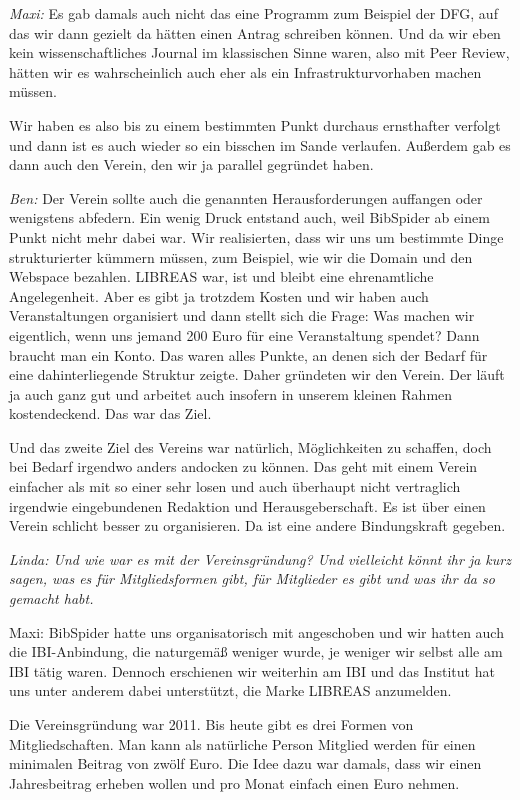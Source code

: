 \documentclass[a4paper,
fontsize=11pt,
oneside,
numbers=noperiodatend,
parskip=half-,
bibliography=totoc,
final
]{scrartcl}
\begin{document}
\emph{Maxi:} Es gab damals auch nicht das eine Programm zum Beispiel der
DFG, auf das wir dann gezielt da hätten einen Antrag schreiben können.
Und da wir eben kein wissenschaftliches Journal im klassischen Sinne
waren, also mit Peer Review, hätten wir es wahrscheinlich auch eher als
ein Infrastrukturvorhaben machen müssen.

Wir haben es also bis zu einem bestimmten Punkt durchaus ernsthafter
verfolgt und dann ist es auch wieder so ein bisschen im Sande verlaufen.
Außerdem gab es dann auch den Verein, den wir ja parallel gegründet
haben.

\emph{Ben:} Der Verein sollte auch die genannten Herausforderungen
auffangen oder wenigstens abfedern. Ein wenig Druck entstand auch, weil
BibSpider ab einem Punkt nicht mehr dabei war. Wir realisierten, dass
wir uns um bestimmte Dinge strukturierter kümmern müssen, zum Beispiel,
wie wir die Domain und den Webspace bezahlen. LIBREAS war, ist und
bleibt eine ehrenamtliche Angelegenheit. Aber es gibt ja trotzdem Kosten
und wir haben auch Veranstaltungen organisiert und dann stellt sich die
Frage: Was machen wir eigentlich, wenn uns jemand 200 Euro für eine
Veranstaltung spendet? Dann braucht man ein Konto. Das waren alles
Punkte, an denen sich der Bedarf für eine dahinterliegende Struktur
zeigte. Daher gründeten wir den Verein. Der läuft ja auch ganz gut und
arbeitet auch insofern in unserem kleinen Rahmen kostendeckend. Das war
das Ziel.

Und das zweite Ziel des Vereins war natürlich, Möglichkeiten zu
schaffen, doch bei Bedarf irgendwo anders andocken zu können. Das geht
mit einem Verein einfacher als mit so einer sehr losen und auch
überhaupt nicht vertraglich irgendwie eingebundenen Redaktion und
Herausgeberschaft. Es ist über einen Verein schlicht besser zu
organisieren. Da ist eine andere Bindungskraft gegeben.

\emph{Linda: Und wie war es mit der Vereinsgründung? Und vielleicht
könnt ihr ja kurz sagen, was es für Mitgliedsformen gibt, für Mitglieder
es gibt und was ihr da so gemacht habt.}

Maxi: BibSpider hatte uns organisatorisch mit angeschoben und wir hatten
auch die IBI-An\-bindung, die naturgemäß weniger wurde, je weniger wir
selbst alle am IBI tätig waren. Dennoch erschienen wir weiterhin am IBI
und das Institut hat uns unter anderem dabei unterstützt, die Marke
LIBREAS anzumelden.

Die Vereinsgründung war 2011. Bis heute gibt es drei Formen von
Mitgliedschaften. Man kann als natürliche Person Mitglied werden für
einen minimalen Beitrag von zwölf Euro. Die Idee dazu war damals, dass
wir einen Jahresbeitrag erheben wollen und pro Monat einfach einen Euro
nehmen.
\end{document}
